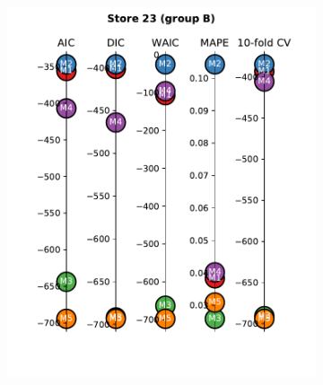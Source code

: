 \documentclass[english, 12pt, a4paper, sci, utf8, a-1b, online]{aaltothesis}
\begin{document}
\begin{abstractpage}[english]
\begin{figure}[hbt]
\begin{subfigure}[htb]{0.33\textwidth}
		\includegraphics[width=\textwidth]{../plots/metrics/metrics_plot_single_store_23_of_B.pdf}
	\end{subfigure}


\end{figure}
\end{abstractpage}
\end{document}
